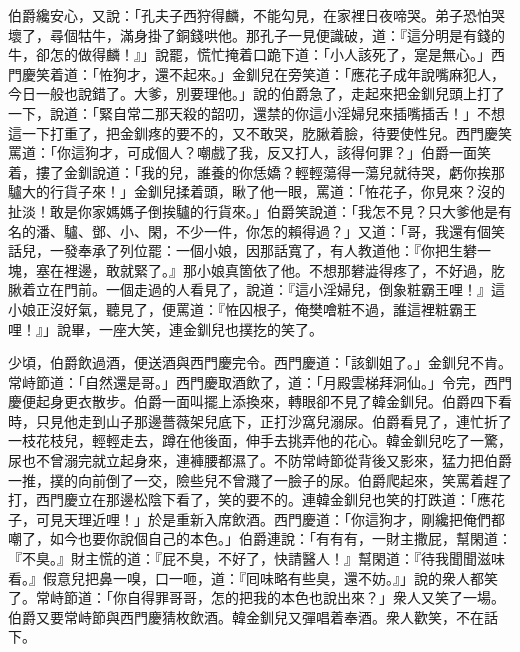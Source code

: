 伯爵纔安心，又說：「孔夫子西狩得麟，不能勾見，在家裡日夜啼哭。弟子恐怕哭壞了，尋個牯牛，滿身掛了銅錢哄他。那孔子一見便識破，道：『這分明是有錢的牛，卻怎的做得麟！』」說罷，慌忙掩着口跪下道：「小人該死了，寔是無心。」西門慶笑着道：「恠狗才，還不起來。」金釧兒在旁笑道：「應花子成年說嘴麻犯人，今日一般也說錯了。{}大爹，別要理他。」說的伯爵急了，走起來把金釧兒頭上打了一下，說道：「緊自常二那天殺的韶叨，還禁的你這小淫婦兒來插嘴插舌！」不想這一下打重了，把金釧疼的要不的，又不敢哭，肐䐐着臉，待要使性兒。西門慶笑罵道：「你這狗才，可成個人？嘲戲了我，反又打人，該得何罪？」伯爵一面笑着，摟了金釧說道：「我的兒，誰養的你恁嬌？輕輕蕩得一蕩兒就待哭，虧你挨那驢大的行貨子來！」金釧兒揉着頭，瞅了他一眼，罵道：「恠花子，你見來？沒的扯淡！敢是你家媽媽子倒挨驢的行貨來。」伯爵笑說道：「我怎不見？只大爹他是有名的潘、驢、鄧、小、閑，不少一件，你怎的賴得過？」又道：「哥，我還有個笑話兒，一發奉承了列位罷：一個小娘，因那話寬了，有人教道他：『你把生礬一塊，塞在裡邊，敢就緊了。』那小娘真箇依了他。不想那礬澁得疼了，不好過，肐䐐着立在門前。一個走過的人看見了，說道：『這小淫婦兒，倒象粧霸王哩！』這小娘正沒好氣，聽見了，便罵道：『恠囚根子，俺樊噲粧不過，誰這裡粧霸王哩！』」說畢，一座大笑，連金釧兒也撲扢的笑了。

少頃，伯爵飲過酒，便送酒與西門慶完令。西門慶道：「該釧姐了。」金釧兒不肯。常峙節道：「自然還是哥。」西門慶取酒飲了，道：「月殿雲梯拜洞仙。」令完，西門慶便起身更衣散步。伯爵一面叫擺上添換來，轉眼卻不見了韓金釧兒。伯爵四下看時，只見他走到山子那邊薔薇架兒底下，正打沙窩兒溺尿。伯爵看見了，連忙折了一枝花枝兒，輕輕走去，蹲在他後面，伸手去挑弄他的花心。韓金釧兒吃了一驚，尿也不曾溺完就立起身來，連褲腰都濕了。{}不防常峙節從背後又影來，猛力把伯爵一推，撲的向前倒了一交，險些兒不曾濺了一臉子的尿。{}伯爵爬起來，笑罵着趕了打，西門慶立在那邊松陰下看了，笑的要不的。連韓金釧兒也笑的打跌道：「應花子，可見天理近哩！」於是重新入席飲酒。西門慶道：「你這狗才，剛纔把俺們都嘲了，如今也要你說個自己的本色。」伯爵連說：「有有有，一財主撒屁，幫閑道：『不臭。』財主慌的道：『屁不臭，不好了，快請醫人！』幫閑道：『待我聞聞滋味看。』假意兒把鼻一嗅，口一咂，{}道：『囘味略有些臭，還不妨。』」說的衆人都笑了。常峙節道：「你自得罪哥哥，怎的把我的本色也說出來？」衆人又笑了一場。伯爵又要常峙節與西門慶猜枚飲酒。韓金釧兒又彈唱着奉酒。衆人歡笑，不在話下。

